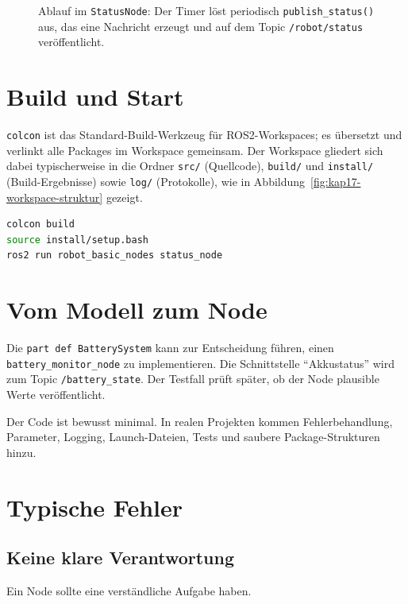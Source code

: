 \begin{figure}[H]
  \centering
  \caption{Ablauf im \texttt{StatusNode}: Der Timer löst periodisch \texttt{publish\_status()} aus, das eine Nachricht erzeugt und auf dem Topic \texttt{/robot/status} veröffentlicht.}
  \label{fig:kap17-ablauf-publisher-timer}
\end{figure}

\section{Build und Start}
\texttt{colcon} ist das Standard-Build-Werkzeug für ROS2-Workspaces; es übersetzt und verlinkt alle Packages im Workspace gemeinsam. Der Workspace gliedert sich dabei typischerweise in die Ordner \texttt{src/} (Quellcode), \texttt{build/} und \texttt{install/} (Build-Ergebnisse) sowie \texttt{log/} (Protokolle), wie in Abbildung~\ref{fig:kap17-workspace-struktur} gezeigt.

\begin{lstlisting}[language=bash]
colcon build
source install/setup.bash
ros2 run robot_basic_nodes status_node
\end{lstlisting}

\section{Vom Modell zum Node}
Die \texttt{part def BatterySystem} kann zur Entscheidung führen, einen \texttt{battery\_monitor\_node} zu implementieren. Die Schnittstelle \enquote{Akkustatus} wird zum Topic \texttt{/battery\_state}. Der Testfall prüft später, ob der Node plausible Werte veröffentlicht.

\begin{hinweisbox}
Der Code ist bewusst minimal. In realen Projekten kommen Fehlerbehandlung, Parameter, Logging, Launch-Dateien, Tests und saubere Package-Strukturen hinzu.
\end{hinweisbox}

\section{Typische Fehler}
\subsection{Keine klare Verantwortung}
Ein Node sollte eine verständliche Aufgabe haben.

